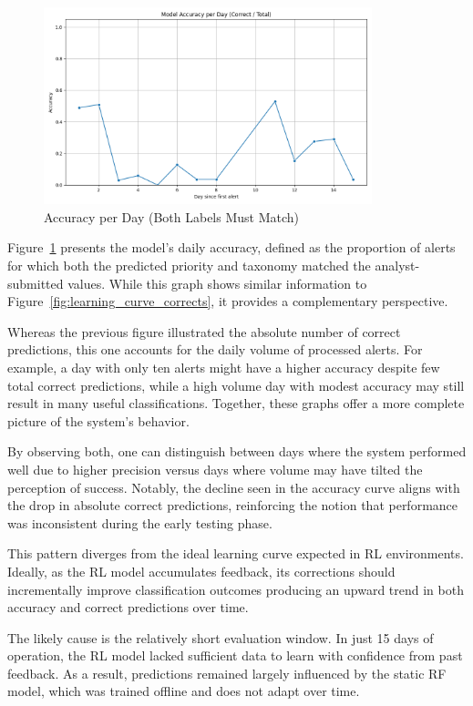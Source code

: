 \begin{figure}[h!]
    \centering
    \includegraphics[width=0.85\textwidth]{ch4/assets/learning_curve_accuracy.png}
    \caption{Accuracy per Day (Both Labels Must Match)}
    \label{fig:learning_curve_accuracy}
\end{figure}

Figure~\ref{fig:learning_curve_accuracy} presents the model's daily accuracy, defined as the proportion of alerts for which both the predicted priority and taxonomy matched the analyst-submitted values. 
While this graph shows similar information to Figure~\ref{fig:learning_curve_corrects}, it provides a complementary perspective.

Whereas the previous figure illustrated the absolute number of correct predictions, this one accounts for the daily volume of processed alerts. 
For example, a day with only ten alerts might have a higher accuracy despite few total correct predictions, while a high volume day with modest accuracy may still result in many useful classifications. 
Together, these graphs offer a more complete picture of the system's behavior.

By observing both, one can distinguish between days where the system performed well due to higher precision versus days where volume may have tilted the perception of success. 
Notably, the decline seen in the accuracy curve aligns with the drop in absolute correct predictions, reinforcing the notion that performance was inconsistent during the early testing phase.

This pattern diverges from the ideal learning curve expected in RL environments. 
Ideally, as the RL model accumulates feedback, its corrections should incrementally improve classification outcomes producing an upward trend in both accuracy and correct predictions over time. 

The likely cause is the relatively short evaluation window. 
In just 15 days of operation, the RL model lacked sufficient data to learn with confidence from past feedback. 
As a result, predictions remained largely influenced by the static RF model, which was trained offline and does not adapt over time.

